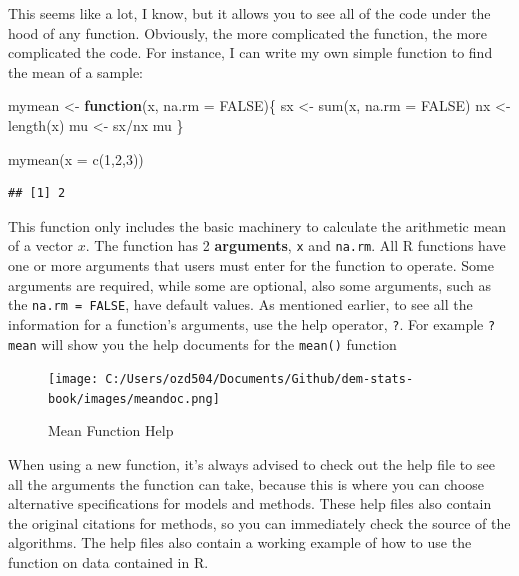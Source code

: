 \documentclass[
]{book}
\newenvironment{Shaded}{\begin{snugshade}}{\end{snugshade}}
\newcommand{\AttributeTok}[1]{\textcolor[rgb]{0.77,0.63,0.00}{#1}}
\newcommand{\ConstantTok}[1]{\textcolor[rgb]{0.00,0.00,0.00}{#1}}
\newcommand{\ControlFlowTok}[1]{\textcolor[rgb]{0.13,0.29,0.53}{\textbf{#1}}}
\newcommand{\DecValTok}[1]{\textcolor[rgb]{0.00,0.00,0.81}{#1}}
\newcommand{\FunctionTok}[1]{\textcolor[rgb]{0.00,0.00,0.00}{#1}}
\newcommand{\NormalTok}[1]{#1}
\newcommand{\OtherTok}[1]{\textcolor[rgb]{0.56,0.35,0.01}{#1}}
\newcommand{\SpecialCharTok}[1]{\textcolor[rgb]{0.00,0.00,0.00}{#1}}
\begin{document}
This seems like a lot, I know, but it allows you to see all of the code
under the hood of any function. Obviously, the more complicated the
function, the more complicated the code. For instance, I can write my
own simple function to find the mean of a sample:

\begin{Shaded}
\begin{Highlighting}[]
\NormalTok{mymean }\OtherTok{\textless{}{-}} \ControlFlowTok{function}\NormalTok{(x,}
                   \AttributeTok{na.rm =} \ConstantTok{FALSE}\NormalTok{)\{}
\NormalTok{  sx }\OtherTok{\textless{}{-}} \FunctionTok{sum}\NormalTok{(x, }
            \AttributeTok{na.rm =} \ConstantTok{FALSE}\NormalTok{)}
\NormalTok{  nx }\OtherTok{\textless{}{-}} \FunctionTok{length}\NormalTok{(x)}
\NormalTok{  mu }\OtherTok{\textless{}{-}}\NormalTok{ sx}\SpecialCharTok{/}\NormalTok{nx}
\NormalTok{  mu}
\NormalTok{\}}

\FunctionTok{mymean}\NormalTok{(}\AttributeTok{x =} \FunctionTok{c}\NormalTok{(}\DecValTok{1}\NormalTok{,}\DecValTok{2}\NormalTok{,}\DecValTok{3}\NormalTok{))}
\end{Highlighting}
\end{Shaded}

\begin{verbatim}
## [1] 2
\end{verbatim}

This function only includes the basic machinery to calculate the
arithmetic mean of a vector \(x\). The function has 2 \textbf{arguments}, \texttt{x}
and \texttt{na.rm}. All R functions have one or more arguments that users must
enter for the function to operate. Some arguments are required, while
some are optional, also some arguments, such as the \texttt{na.rm\ =\ FALSE},
have default values. As mentioned earlier, to see all the information
for a function's arguments, use the help operator, \texttt{?}. For example
\texttt{?mean} will show you the help documents for the \texttt{mean()} function

\begin{figure}
\centering
\texttt{[image: C:/Users/ozd504/Documents/Github/dem-stats-book/images/meandoc.png]}
\caption{Mean Function
Help}
\end{figure}

When using a new function, it's always advised to check out the help
file to see all the arguments the function can take, because this is
where you can choose alternative specifications for models and methods.
These help files also contain the original citations for methods, so you
can immediately check the source of the algorithms. The help files also
contain a working example of how to use the function on data contained
in R.
\end{document}

